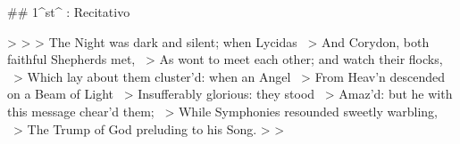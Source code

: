 ## 1^st^ \mvmt: Recitativo

> \beginnumbering
> \pstart
> The Night was dark and silent; when Lycidas \
> And Corydon, both faithful Shepherds met, \
> As wont to meet each other; and watch their flocks, \
> Which lay about them cluster’d: when an Angel \
> From Heav’n descended on a Beam of Light \
> Insufferably glorious: they stood \
> Amaz’d: but he with this message chear’d them; \
> While Symphonies resounded sweetly warbling, \
> The Trump of God preluding to his Song.
> \pend
> \endnumbering
